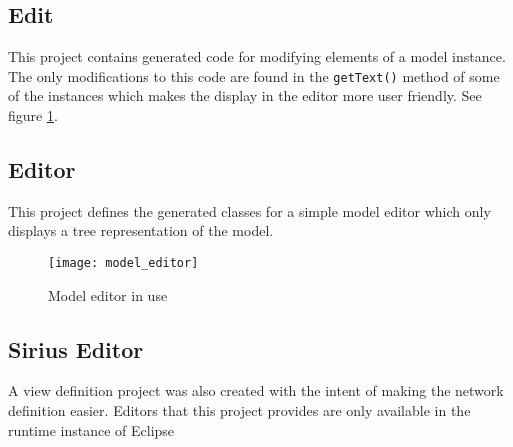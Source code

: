\subsection{Edit}
This project contains generated code for modifying elements of a model instance. The only
modifications to this code are found in the \texttt{getText()} method of some of the instances
which makes the display in the editor more user friendly. See figure \ref{fig:model_editor}.
\subsection{Editor}
This project defines the generated classes for a simple model editor which
only displays a tree representation of the model.
\begin{figure}[H]
    \centering
    \texttt{[image: model\_editor]}
    \caption{Model editor in use}
    \label{fig:model_editor}
\end{figure}
\subsection{Sirius Editor}
A view definition project was also created with the intent of making the network
definition easier. Editors that this project provides are only available in the 
runtime instance of Eclipse

